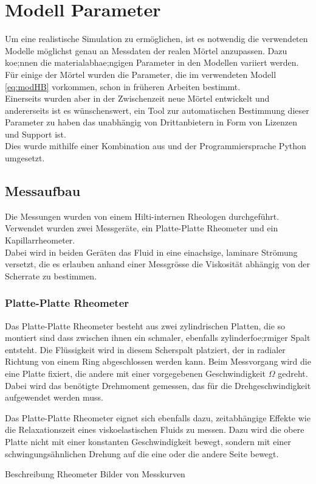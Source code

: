 \section{Modell Parameter}
\label{Kapitel:Parameter}
Um eine realistische Simulation zu ermöglichen, ist es notwendig die verwendeten Modelle möglichst genau an Messdaten der realen Mörtel anzupassen. Dazu koe;nnen die materialabhae;ngigen Parameter in den Modellen variiert werden.\\
Für einige der Mörtel wurden die Parameter, die im verwendeten Modell \eqref{eq:modHB} vorkommen, schon in früheren Arbeiten bestimmt. \\
Einerseits wurden aber in der Zwischenzeit neue Mörtel entwickelt und andererseits ist es wünschenswert, ein Tool zur automatischen Bestimmung dieser Parameter zu haben das unabhängig von Drittanbietern in Form von Lizenzen und Support ist. \\
Dies wurde mithilfe einer Kombination aus \openfoam{} und der Programmiersprache Python umgesetzt.
%
\subsection{Messaufbau}
Die Messungen wurden von einem Hilti-internen Rheologen durchgeführt. Verwendet wurden zwei Messgeräte, ein Platte-Platte Rheometer und ein Kapillarrheometer.\\
Dabei wird in beiden Geräten das Fluid in eine einachsige, laminare Strömung versetzt, die es erlauben anhand einer Messgrösse die Viskosität abhängig von der Scherrate zu bestimmen.
%
\subsubsection{Platte-Platte Rheometer}
\label{Kapitel:Parameter:PlattePlatteRheo}
Das Platte-Platte Rheometer besteht aus zwei zylindrischen Platten, die so montiert sind dass zwischen ihnen ein schmaler, ebenfalls zylinderfoe;rmiger Spalt entsteht. 
Die Flüssigkeit wird in diesem Scherspalt platziert, der in radialer Richtung von einem Ring abgeschlossen werden kann. Beim Messvorgang wird die eine Platte fixiert, die andere mit einer vorgegebenen Geschwindigkeit $\Omega$ gedreht.
Dabei wird das benötigte Drehmoment gemessen, das für die Drehgeschwindigkeit aufgewendet werden muss.

Das Platte-Platte Rheometer eignet sich ebenfalls dazu, zeitabhängige Effekte wie die Relaxationszeit eines viskoelastischen Fluids zu messen. 
Dazu wird die obere Platte nicht mit einer konstanten Geschwindigkeit bewegt, sondern mit einer schwingungsähnlichen Drehung auf die eine oder die andere Seite bewegt.
%
\begin{todocontent}
    \1 Beschreibung Rheometer
    \1 Bilder von Messkurven
\end{todocontent}
%
